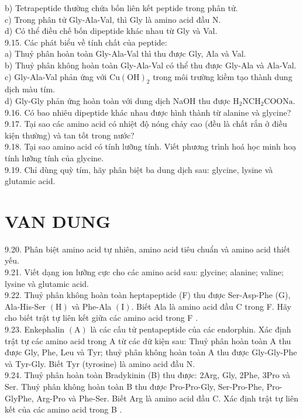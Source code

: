 \documentclass[10pt]{article}
\begin{document}
b) Tetrapeptide thường chứa bốn liên kết peptide trong phân tử.\\
c) Trong phân tử Gly-Ala-Val, thì Gly là amino acid đầu N.\\
d) Có thể điều chế bốn dipeptide khác nhau từ Gly và Val.\\
9.15. Các phát biểu về tính chất của peptide:\\
a) Thuỷ phân hoàn toàn Gly-Ala-Val thì thu được Gly, Ala và Val.\\
b) Thuỷ phân không hoàn toàn Gly-Ala-Val có thể thu được Gly-Ala và Ala-Val.\\
c) Gly-Ala-Val phản ứng với $\mathrm{Cu}(\mathrm{OH})_{2}$ trong môi trường kiềm tạo thành dung dịch màu tím.\\
d) Gly-Gly phản ứng hoàn toàn với dung dịch NaOH thu được $\mathrm{H}_{2} \mathrm{NCH}_{2} \mathrm{COONa}$.\\
9.16. Có bao nhiêu dipeptide khác nhau được hình thành từ alanine và glycine?\\
9.17. Tại sao các amino acid có nhiệt độ nóng chảy cao (đều là chất rắn ở điều kiện thường) và tan tốt trong nước?\\
9.18. Tại sao amino acid có tính lưỡng tính. Viết phương trình hoá học minh hoạ tính lưỡng tính của glycine.\\
9.19. Chỉ dùng quỳ tím, hãy phân biệt ba dung dịch sau: glycine, lysine và glutamic acid.

\section*{VAN DUNG}
9.20. Phân biệt amino acid tự nhiên, amino acid tiêu chuẩn và amino acid thiết yếu.\\
9.21. Viết dạng ion lưỡng cực cho các amino acid sau: glycine; alanine; valine; lysine và glutamic acid.\\
9.22. Thuỷ phân không hoàn toàn heptapeptide (F) thu được Ser-Asp-Phe (G), Ala-His-Ser $(\mathrm{H})$ và Phe-Ala $(\mathrm{I})$. Biết Ala là amino acid đầu C trong F. Hãy cho biết trật tự liên kết giữa các amino acid trong F .\\
9.23. Enkephalin $(\mathrm{A})$ là các cấu tử pentapeptide của các endorphin. Xác định trật tự các amino acid trong A từ các dữ kiện sau: Thuỷ phân hoàn toàn A thu được Gly, Phe, Leu và Tyr; thuỷ phân không hoàn toàn A thu được Gly-Gly-Phe và Tyr-Gly. Biết Tyr (tyrosine) là amino acid đầu N.\\
9.24. Thuỷ phân hoàn toàn Bradykinin (B) thu được: 2Arg, Gly, 2Phe, 3Pro và Ser. Thuỷ phân không hoàn toàn B thu được Pro-Pro-Gly, Ser-Pro-Phe, Pro-GlyPhe, Arg-Pro và Phe-Ser. Biết Arg là amino acid đầu C. Xác định trật tự liên kết của các amino acid trong B .
\end{document}
